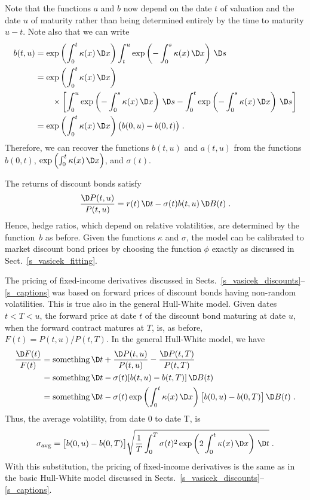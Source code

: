 Note that the functions $a$ and $b$ now depend on the date $t$ of valuation and the date $u$ of maturity rather than being determined entirely by the time to maturity $u-t$.  Note also that we can write
\begin{align}
b(t,u) &= \exp\left(\int_0^t\kappa(x)\,\D x\right)\int_t^u\exp\left(-\int_0^s\kappa(x)\,\D x\right)\,\D s\notag\\
&= \exp\left(\int_0^t\kappa(x)\,\D x\right)\\
&\qquad \times\left[\int_0^u\exp\left(-\int_0^s\kappa(x)\,\D x\right)\,\D s - \int_0^t\exp\left(-\int_0^s\kappa(x)\,\D x\right)\,\D s\right]\notag\\
&=\exp\left(\int_0^t\kappa(x)\,\D x\right)\big(b(0,u)-b(0,t)\big)\;.\label{hw2btu}
\end{align}
Therefore, we can recover the functions $b(t,u)$ and  $a(t,u)$ from the functions $b(0,t)$, $\exp\left(\int_0^t\kappa(x)\,\D x\right)$, and $\sigma(t)$.

\vfil\eject
The returns of discount bonds satisfy
\begin{equation}\label{extendedvasicekbondreturn2}
\frac{\D P(t,u)}{P(t,u)} = r(t)\,\D t - \sigma(t) b(t,u)\,\D B(t)\;.
\end{equation}
Hence, hedge ratios, which depend on relative volatilities, are  determined by the function~$b$ as before.  Given the functions $\kappa$ and $\sigma$, the model can be calibrated to market discount bond prices by choosing the function $\phi$ exactly as discussed in Sect.~\ref{s_vasicek_fitting}.  

The pricing of fixed-income derivatives discussed in Sects.~\ref{s_vasicek_discounts}--\ref{s_captions} was based on  forward prices of discount bonds having non-random volatilities.  This is true also in the general Hull-White model.  Given dates $t<T<u$, the forward price at date $t$ of the discount bond maturing at date $u$, when the forward contract matures at $T$, is, as before, $F(t)=P(t,u)/P(t,T)$.  In the general Hull-White model, we have
\begin{align*}
\frac{\D F(t)}{F(t)} &= \text{something}\,\D t + \frac{\D P(t,u)}{P(t,u)} - \frac{\D P(t,T)}{P(t,T)}\\
&= \text{something}\,\D t -\sigma(t)[b(t,u)-b(t,T)]\,\D B(t)\\
&= \text{something}\,\D t -\sigma(t)\exp\left(\int_0^t\kappa(x)\,\D x\right)\big[b(0,u)-b(0,T)\big]\,\D B(t)\;.
\end{align*}
Thus, the average volatility, from date 0 to date T, is 
$$\sigma_{\text{avg}} = \big[b(0,u)-b(0,T)\big]\sqrt{\frac{1}{T}\int_0^T \sigma(t)^2\exp\left(2\int_0^t\kappa(x)\,\D x\right)\,\D t}\; .$$
With this substitution,  the pricing of fixed-income derivatives is the same as in the basic Hull-White model discussed in Sects.~\ref{s_vasicek_discounts}--\ref{s_captions}.


